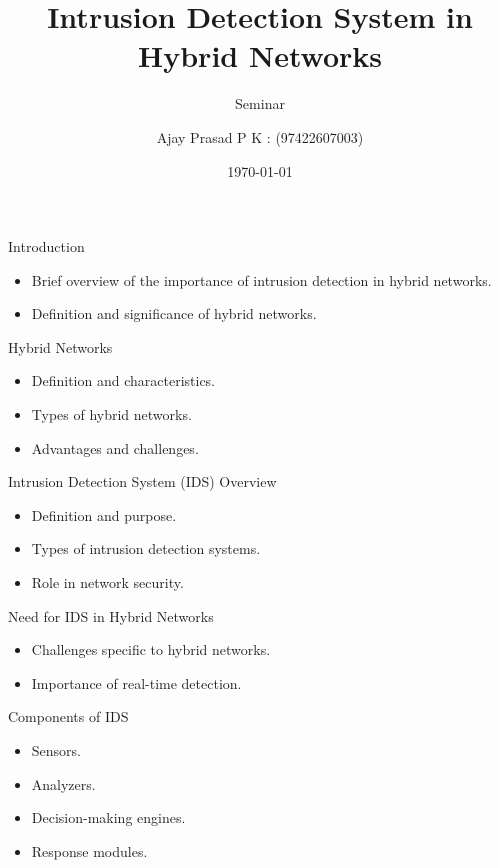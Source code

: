 \documentclass{beamer}
\title{Intrusion Detection System in Hybrid Networks}
\subtitle{Seminar}
\author{Ajay Prasad P K : (97422607003) }
\date{\today}
\begin{document}
\frame{\titlepage}

\begin{frame}{Introduction}
    \begin{itemize}
        \item Brief overview of the importance of intrusion detection in hybrid networks.
        \item Definition and significance of hybrid networks.
    \end{itemize}
\end{frame}


\begin{frame}{Hybrid Networks}
    \begin{itemize}
        \item Definition and characteristics.
        \item Types of hybrid networks.
        \item Advantages and challenges.
    \end{itemize}
\end{frame}


\begin{frame}{Intrusion Detection System (IDS) Overview}
    \begin{itemize}
        \item Definition and purpose.
        \item Types of intrusion detection systems.
        \item Role in network security.
    \end{itemize}
\end{frame}


\begin{frame}{Need for IDS in Hybrid Networks}
    \begin{itemize}
        \item Challenges specific to hybrid networks.
        \item Importance of real-time detection.
    \end{itemize}
\end{frame}


\begin{frame}{Components of IDS}
    \begin{itemize}
        \item Sensors.
        \item Analyzers.
        \item Decision-making engines.
        \item Response modules.
    \end{itemize}
\end{frame}
\end{document}
